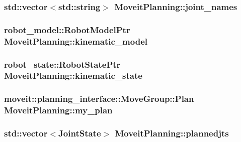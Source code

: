 \hypertarget{classMoveitPlanning_a36a6b85e1318172afbcce875a73cea10}{
\subsubsection[{joint\-\_\-names}]{\setlength{\rightskip}{0pt plus 5cm}std\-::vector$<$std\-::string$>$ Moveit\-Planning\-::joint\-\_\-names}}\label{classMoveitPlanning_a36a6b85e1318172afbcce875a73cea10}
\hypertarget{classMoveitPlanning_a9311edd62f690d6fb5398e62df2df18c}{
\subsubsection[{kinematic\-\_\-model}]{\setlength{\rightskip}{0pt plus 5cm}robot\-\_\-model\-::\-Robot\-Model\-Ptr Moveit\-Planning\-::kinematic\-\_\-model}}\label{classMoveitPlanning_a9311edd62f690d6fb5398e62df2df18c}
\hypertarget{classMoveitPlanning_af7d64860fac3ae411904770755904345}{
\subsubsection[{kinematic\-\_\-state}]{\setlength{\rightskip}{0pt plus 5cm}robot\-\_\-state\-::\-Robot\-State\-Ptr Moveit\-Planning\-::kinematic\-\_\-state}}\label{classMoveitPlanning_af7d64860fac3ae411904770755904345}
\hypertarget{classMoveitPlanning_a981942759c10b3127a9d8d80ae54ef44}{
\subsubsection[{my\-\_\-plan}]{\setlength{\rightskip}{0pt plus 5cm}moveit\-::planning\-\_\-interface\-::\-Move\-Group\-::\-Plan Moveit\-Planning\-::my\-\_\-plan}}\label{classMoveitPlanning_a981942759c10b3127a9d8d80ae54ef44}
\hypertarget{classMoveitPlanning_ae0a57c1497f666564f307e1f53f2b974}{
\subsubsection[{plannedjts}]{\setlength{\rightskip}{0pt plus 5cm}std\-::vector$<${\bf Joint\-State}$>$ Moveit\-Planning\-::plannedjts}}\label{classMoveitPlanning_ae0a57c1497f666564f307e1f53f2b974}


